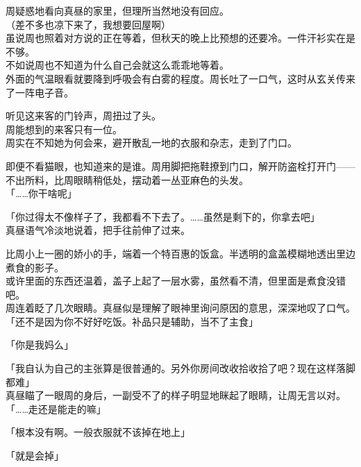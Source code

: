 周疑惑地看向真昼的家里，但理所当然地没有回应。\\

（差不多也凉下来了，我想要回屋啊）\\

虽说周也照着对方说的正在等着，但秋天的晚上比预想的还要冷。一件汗衫实在是不够。\\

不如说周也不知道为什么自己会就这么乖乖地等着。\\

外面的气温眼看就要降到呼吸会有白雾的程度。周长吐了一口气，这时从玄关传来了一阵电子音。

听见这来客的门铃声，周扭过了头。\\

周能想到的来客只有一位。\\

周实在不知她为何会来，避开散乱一地的衣服和杂志，走到了门口。

即便不看猫眼，也知道来的是谁。周用脚把拖鞋撩到门口，解开防盗栓打开门——不出所料，比周眼睛稍低处，摆动着一丛亚麻色的头发。\\

「……你干啥呢」

「你过得太不像样子了，我都看不下去了。……虽然是剩下的，你拿去吧」\\

真昼语气冷淡地说着，把手往前伸了过来。

比周小上一圈的娇小的手，端着一个特百惠的饭盒。半透明的盒盖模糊地透出里边煮食的影子。\\

或许里面的东西还温着，盖子上起了一层水雾，虽然看不清，但里面是煮食没错吧。\\

周连着眨了几次眼睛。真昼似是理解了眼神里询问原因的意思，深深地叹了口气。\\

「还不是因为你不好好吃饭。补品只是辅助，当不了主食」

「你是我妈么」

「我自认为自己的主张算是很普通的。另外你房间改收拾收拾了吧？现在这样落脚都难」\\

真昼瞄了一眼周的身后，一副受不了的样子明显地眯起了眼睛，让周无言以对。\\

「……走还是能走的嘛」

「根本没有啊。一般衣服就不该掉在地上」

「就是会掉」

